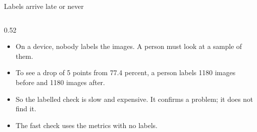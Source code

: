 \begin{frame}{Labels arrive late or never}
  \begin{columns}[T]
    \begin{column}{0.52\textwidth}
      \small
      \begin{itemize}
        \item On a device, nobody labels the images. A person must look at
              a sample of them.
        \item To see a drop of 5 points from 77.4 percent, a person labels
              1180 images before and 1180 images after.
        \item So the labelled check is slow and expensive. It confirms a
              problem; it does not find it.
        \item The fast check uses the metrics with no labels.
      \end{itemize}
    \end{column}
  \end{columns}
\end{frame}

